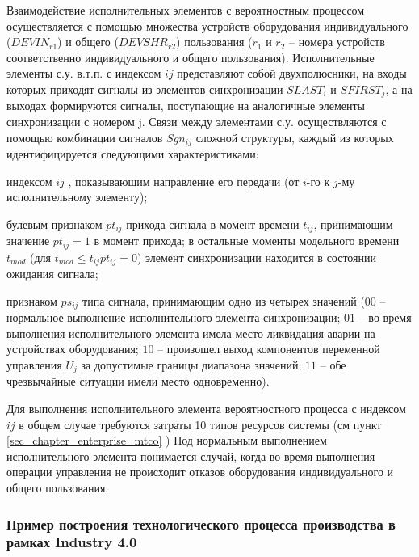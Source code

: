 Взаимодействие исполнительных элементов с вероятностным процессом осуществляется с помощью множества устройств оборудования индивидуального  ($DEVIN_{r1}$) и общего ($DEVSHR_{r2}$) пользования ($r_1$ и $r_2$ – номера устройств соответственно индивидуального и общего пользования). Исполнительные элементы с.у. в.т.п. с индексом $ij$ представляют собой двухполюсники, на входы которых приходят сигналы из элементов синхронизации $SLAST_i$ и $SFIRST_j$, а на выходах формируются сигналы, поступающие на аналогичные элементы синхронизации с номером j. Связи между элементами с.у. осуществляются с помощью комбинации сигналов {$Sgn_{ij}$} сложной структуры, каждый из которых идентифицируется следующими характеристиками:
\begin{textitemize}
    \item индексом $ij$ , показывающим направление его передачи (от $i$-го к $j$-му исполнительному элементу);
    \item булевым признаком $pt_{ij}$ прихода сигнала в момент времени $t_{ij}$, принимающим значение  $pt_{ij}=1$ в момент прихода; в остальные моменты модельного времени $t_{mod}$ (для $t_{mod} \leq t_{ij} pt_{ij}=0$) элемент синхронизации находится в состоянии ожидания сигнала;
    \item признаком $ps_{ij}$ типа сигнала, принимающим одно из четырех значений ($00$ – нормальное выполнение исполнительного элемента синхронизации; $01$ – во время выполнения исполнительного элемента имела место ликвидация аварии на устройствах оборудования; $10$ – произошел выход компонентов переменной управления $U_j$ за допустимые границы диапазона значений; $11$ – обе чрезвычайные ситуации имели место одновременно).
\end{textitemize}


Для выполнения исполнительного элемента вероятностного процесса с индексом $ij$ в общем случае требуются затраты 10 типов ресурсов системы (см пункт \ref{sec_chapter_enterprise_mtco} )
Под нормальным выполнением исполнительного элемента понимается случай, когда во время выполнения операции управления не происходит отказов оборудования индивидуального и общего пользования.


\subsubsection{Пример построения технологического процесса производства в рамках Industry 4.0}
\label{sec_chapter_enterprise_example_industry4}


